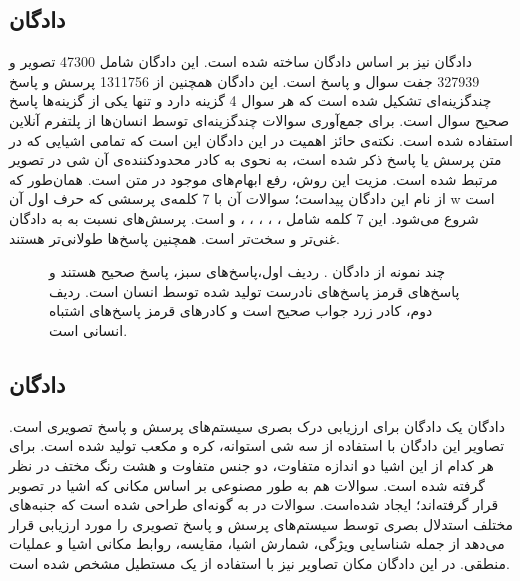 \subsection{دادگان }
	‌دادگان
 \cite{zhu2016visual7w}
	نیز بر اساس ‌دادگان
 \cite{lin2014microsoft}
	  ساخته ‌شده‌ است. این دادگان شامل 47300 تصویر و 327939 جفت سوال و پاسخ است. این ‌دادگان همچنین از 1311756 پرسش و پاسخ چند‌گزینه‌ای تشکیل‌ شده‌ است که هر سوال 4 گزینه دارد و تنها یکی از گزینه‌ها پاسخ صحیح سوال است. برای جمع‌آوری سوالات چندگزینه‌ای توسط انسان‌ها از پلتفرم آنلاین 
  استفاده ‌شده ‌است. نکته‌ی حائز اهمیت در این ‌‌دادگان این است که تمامی اشیایی که در متن پرسش یا پاسخ ذکر ‌شده‌ است، به نحوی به کادر محدود‌کننده‌ی آن شی در تصویر مرتبط شده‌ است. مزیت این روش، رفع ابهام‌های موجود در متن است.  همان‌طور که از نام این ‌دادگان پیداست؛ سوالات آن با 7 کلمه‌ی پرسشی که حرف اول آن w است شروع می‌شود. این 7 کلمه شامل
  ،
  ،
  ،
  ،
  ،
  و
	است. پرسش‌های
	 نسبت به به ‌دادگان 
  غنی‌تر و سخت‌تر است. همچنین پاسخ‌ها طولانی‌تر هستند.
  \begin{figure}
  	\caption[چند نمونه از ‌دادگان ]{چند نمونه از ‌دادگان
  		  \cite{zhu2016visual7w}. 
  		 ردیف اول،پاسخ‌های سبز، پاسخ صحیح هستند و پاسخ‌های قرمز پاسخ‌های نادرست تولید شده توسط انسان است. ردیف دوم، کادر زرد جواب صحیح است و کادرهای قرمز پاسخ‌های اشتباه انسانی است.}
  	\label{fig:Visual7WExample}
  \end{figure}
  
\subsection{ دادگان }
دادگان
\cite{johnson2017clevr}
 یک ‌دادگان برای ارزیابی درک بصری سیستم‌های پرسش و پاسخ تصویری است. تصاویر این ‌دادگان با استفاده از سه شی استوانه، کره و مکعب تولید شده ‌است. برای هر کدام از این اشیا دو اندازه متفاوت، دو جنس متفاوت و هشت رنگ مختف در نظر گرفته شده است. سوالات هم به طور مصنوعی بر اساس مکانی که اشیا در تصوبر قرار گرفته‌اند؛ ایجاد شده‌است. سوالات در
   به گونه‌ای طراحی ‌شده ‌است که جنبه‌های مختلف استدلال بصری توسط سیستم‌های پرسش و پاسخ تصویری را مورد ارزیابی قرار می‌دهد از جمله شناسایی ویژگی، شمارش اشیا، مقایسه، روابط مکانی اشیا و عملیات منطقی. در این ‌دادگان مکان تصاویر نیز با استفاده از یک مستطیل مشخص ‌شده ‌است.
   
